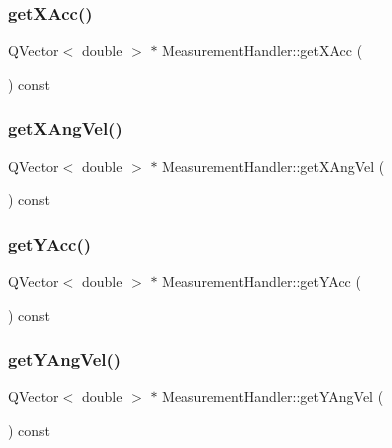 \mbox{\label{class_measurement_handler_a4dd297cf8cc08203264492496b4378ee}} 
\subsubsection{get\+X\+Acc()}
{\footnotesize\ttfamily Q\+Vector$<$ double $>$ $\ast$ Measurement\+Handler\+::get\+X\+Acc (\begin{DoxyParamCaption}{ }\end{DoxyParamCaption}) const}

\mbox{\label{class_measurement_handler_ae5930434d2c8d66ac124f996fa9fd12d}} 
\subsubsection{get\+X\+Ang\+Vel()}
{\footnotesize\ttfamily Q\+Vector$<$ double $>$ $\ast$ Measurement\+Handler\+::get\+X\+Ang\+Vel (\begin{DoxyParamCaption}{ }\end{DoxyParamCaption}) const}

\mbox{\label{class_measurement_handler_a1c7cc1cd1c7e6a1629ad62877e22bd00}} 
\subsubsection{get\+Y\+Acc()}
{\footnotesize\ttfamily Q\+Vector$<$ double $>$ $\ast$ Measurement\+Handler\+::get\+Y\+Acc (\begin{DoxyParamCaption}{ }\end{DoxyParamCaption}) const}

\mbox{\label{class_measurement_handler_ae2053ba8ad1924ff0ad7c2538da7a35e}} 
\subsubsection{get\+Y\+Ang\+Vel()}
{\footnotesize\ttfamily Q\+Vector$<$ double $>$ $\ast$ Measurement\+Handler\+::get\+Y\+Ang\+Vel (\begin{DoxyParamCaption}{ }\end{DoxyParamCaption}) const}

